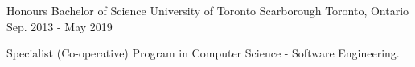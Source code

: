 

\begin{cventries}

  \cventry
    {Honours Bachelor of Science} %
    {University of Toronto Scarborough} %
    {Toronto, Ontario} %
    {Sep. 2013 - May 2019} %
    {
      \begin{cvitems} %
        \item {Specialist (Co-operative) Program in Computer Science - Software Engineering.}
      \end{cvitems}
    }

\end{cventries}
